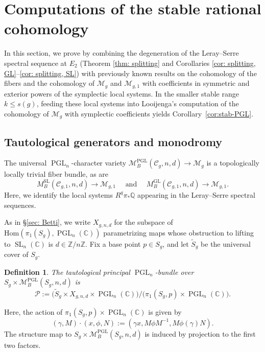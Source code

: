 \documentclass[11pt,reqno]{amsart}
\theoremstyle{plain} %
\newtheorem{definition}[theorem]{Definition}
\theoremstyle{definition}
\newcommand{\QQ}{\mathbb{Q}}
\newcommand{\CC}{\mathbb{C}}
\newcommand{\Hom}{\mathrm{Hom}}
\newcommand{\M}{\mathcal{M}}
\newcommand{\C}{\mathcal{C}}
\newcommand{\mc}{\mathcal}
\newcommand{\ZZ}{\mathbb{Z}}
\DeclareMathOperator{\GL}{GL}
\DeclareMathOperator{\SL}{SL}
\DeclareMathOperator{\PGL}{PGL}
\begin{document}
\section{Computations of the stable rational cohomology} \label{sec: computations}
In this section, we prove  by combining the degeneration of the Leray--Serre spectral sequence at $E_2$ (Theorem \ref{thm: splitting} and Corollaries \ref{cor: splitting, GL}--\ref{cor: splitting, SL}) with previously known results on the cohomology of the fibers  and the cohomology of $\M_g$ and $\M_{g,1}$ with coefficients in symmetric and exterior powers of the symplectic local systems. In the smaller stable range $k \le s(g)$, feeding these local systems into Looijenga's computation of the cohomology of $\M_g$ with symplectic coefficients \cite{looijenga-symplectic-coeffs} yields Corollary~\ref{cor:stab-PGL}.




\subsection{Tautological generators and monodromy} \label{subsec: monodromy}

The universal $\PGL_n$-character variety $\M_B^{\PGL}(\C_g,n,d) \to \M_g$ is a topologically locally trivial fiber bundle, as are
\[
M_B^{\SL}(\C_{g,1},n,d) \to \M_{g,1} \quad \mbox{ and } \quad M_B^{\GL}(\C_{g,1},n,d) \to \M_{g,1}.
\]
Here, we identify the local systems $R^q \pi_* \QQ$ appearing in the Leray--Serre spectral sequences.  

As in \S\ref{sec: Betti}, we write $X_{g,n,d}$ for the subspace of $\Hom(\pi_1(S_g), \PGL_n(\CC))$ parametrizing maps whose obstruction to lifting to $\SL_n(\CC)$ is $d \in \ZZ/n\ZZ$. Fix a base point $p \in S_g$, and let $\widetilde S_g$ be the universal cover of $S_g$.

\begin{definition} \label{def: universal PGL bundle}
    The tautological principal $\PGL_n$-bundle over $S_g \times \M^{\PGL}_B(S_g,n,d)$ is $$ \mc P := \big(\widetilde S_g \times X_{g,n,d} \times \PGL_n(\CC)\big)/\big(\pi_1(S_g,p) \times \PGL_n(\CC)\big).$$
\end{definition} 
\noindent  
Here, the action of $\pi_1(S_g,p) \times \PGL_n(\CC)$ is given by
$$(\gamma, M) \cdot (x, \phi, N) := (\gamma x, M\phi M^{-1}, M \phi(\gamma) N).$$
The structure map to $S_g \times \M_B^{\PGL}(S_g,n,d)$ is induced by projection to the first two factors.
\end{document}
